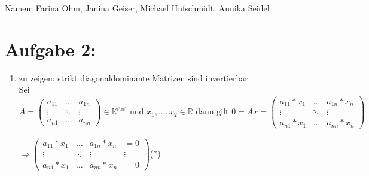 \documentclass[ngerman]{article}
\begin{document}
\begin{flushright}
\small{Namen: Farina Ohm, Janina Geiser, Michael Hufschmidt, Annika Seidel}\normalsize
\end{flushright}
\section*{Aufgabe 2:}
\renewcommand{\labelenumi}{\alph{enumi})}
\begin{enumerate}
\item zu zeigen: strikt diagonaldominante Matrizen sind invertierbar\\
\newline
Sei $ A =
\begin{pmatrix}
a_{11}&\dots&a_{1n}\\
\vdots&\ddots&\vdots\\
a_{n1}&\dots&a_{nn}
\end{pmatrix}
\in \mathbb{K^{\text{nxn}}}
\text{ und } x_1,...,x_2 \in \mathbb{R} \text{ dann gilt }
0 = Ax = 
\begin{pmatrix}
a_{11}*x_1&\dots&a_{1n}*x_n\\
\vdots&\ddots&\vdots\\
a_{n1}*x_1&\dots&a_{nn}*x_n
\end{pmatrix}$

$\Rightarrow\begin{pmatrix}
a_{11}*x_1&\dots&a_{1n}*x_n&=0\\
\vdots&\ddots&\vdots&\vdots\\
a_{n1}*x_1&\dots&a_{nn}*x_n&=0
\end{pmatrix}$(*)


\end{enumerate}
\end{document}
